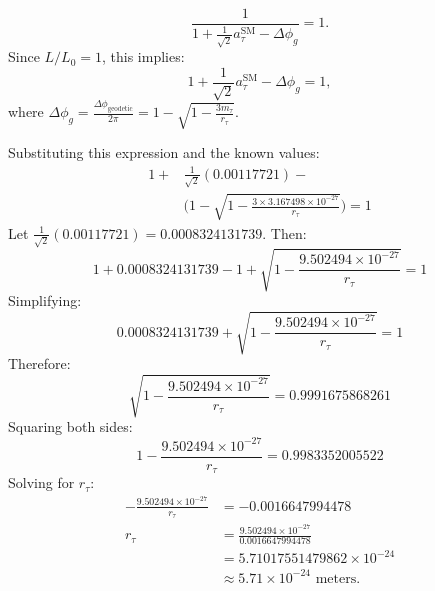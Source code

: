 \documentclass[%
 reprint,
 amsmath,amssymb,
 aps,
]{revtex4-1}
\numberwithin{equation}{section}%
\begin{document}
\begin{equation}
   \frac{1}{1 + \frac{1}{\sqrt{2}}a^{\text{SM}}_{\tau} - \Delta\phi_g} = 1.
\label{eq:lorentz_ratio_tau_start}
\end{equation}
Since $L/L_0 = 1$, this implies:
\begin{equation}
   1 + \frac{1}{\sqrt{2}}a^{\text{SM}}_{\tau} - \Delta\phi_g = 1,
\label{eq:basis_equation_tau}
\end{equation}
where $\Delta\phi_g = \frac{\Delta \phi_{\text{geodetic}}}{2\pi} = 1 - \sqrt{1 - \frac{3m_{\tau}}{r_{\tau}}}$.

\noindent Substituting this expression and the known values:
\begin{equation}
\begin{aligned}
1 + & \frac{1}{\sqrt{2}}(0.00117721) - \\
& \biggl(1 - \sqrt{1 - \frac{3 \times 3.167498 \times 10^{-27}}{r_{\tau}}}\biggr) = 1
\end{aligned}
\label{eq:full_equation_tau}
\end{equation}
Let $\frac{1}{\sqrt{2}}(0.00117721) = 0.0008324131739$. Then:
\begin{equation}
   1 + 0.0008324131739 - 1 + \sqrt{1 - \frac{9.502494 \times 10^{-27}}{r_{\tau}}} = 1
\label{eq:simplified_equation_tau}
\end{equation}
Simplifying:
\begin{equation}
   0.0008324131739 + \sqrt{1 - \frac{9.502494 \times 10^{-27}}{r_{\tau}}} = 1
\label{eq:further_simplified_tau}
\end{equation}
Therefore:
\begin{equation}
   \sqrt{1 - \frac{9.502494 \times 10^{-27}}{r_{\tau}}} = 0.9991675868261
\label{eq:sqrt_equation_tau}
\end{equation}
Squaring both sides:
\begin{equation}
   1 - \frac{9.502494 \times 10^{-27}}{r_{\tau}} = 0.9983352005522
\label{eq:squared_equation_tau}
\end{equation}
Solving for $r_{\tau}$:
\begin{equation}
   \begin{split}
       -\frac{9.502494 \times 10^{-27}}{r_{\tau}} &= -0.0016647994478\\
       r_{\tau} &= \frac{9.502494 \times 10^{-27}}{0.0016647994478}\\
       &= 5.71017551479862 \times 10^{-24}\\
       &\approx 5.71 \times 10^{-24} \text{ meters}.
       \end{split}
\label{eq:final_radius_tau}
\end{equation}
\end{document}
